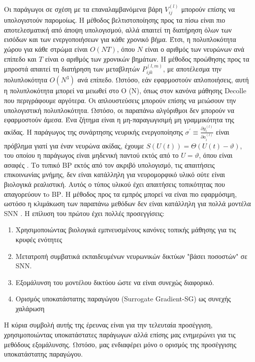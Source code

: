 \documentclass[12pt]{report}
\begin{document}
Οι παράγωγοι σε σχέση με τα επαναλαμβανόμενα βάρη $V_{i j}^{(l)}$ μπορούν επίσης να υπολογιστούν παρομοίως. Η μέθοδος βελτιστοποίησης προς τα πίσω είναι πιο αποτελεσματική από άποψη υπολογισμού, αλλά απαιτεί τη διατήρηση όλων των εισόδων και των ενεργοποιήσεων για κάθε χρονικό βήμα. Έτσι, η πολυπλοκότητα χώρου για κάθε στρώμα είναι $O(N T)$, όπου $N$ είναι ο αριθμός των νευρώνων ανά επίπεδο και $T$ είναι ο αριθμός των χρονικών βημάτων. Η μέθοδος προώθησης προς τα μπροστά απαιτεί τη διατήρηση των μεταβλητών $P_{i j k}^{(l, m)}$, με αποτέλεσμα την πολυπλοκότητα $O\left(N^{3}\right)$ ανά επίπεδο. Ωστόσο, εάν εφαρμοστούν απλοποιήσεις, αυτή η πολυπλοκότητα μπορεί να μειωθεί στο O (N), όπως στον κανόνα μάθησης \textlatin{Decolle} που περιγράφουμε αργότερα. Οι απλουστεύσεις μπορούν επίσης να μειώσουν την υπολογιστική πολυπλοκότητα.
Ωστόσο, οι παραπάνω αλγόριθμοι δεν μπορούν να εφαρμοστούν άμεσα. Ένα ζήτημα είναι η μη-παραγωγισιμή μη γραμμικότητα της ακίδας. Η παράγωγος της συνάρτησης νευρικής ενεργοποίησης $\sigma^{\prime} \equiv \frac{\partial y_{i}^{(l)}}{\partial a_{i}^{(l)}}$ είναι  πρόβλημα γιατί για έναν νευρώνα ακίδας, έχουμε $S(U(t))=\Theta(U(t)-\vartheta)$, του οποίου η παράγωγος είναι μηδενική παντού εκτός από το $U=\vartheta$, όπου είναι ασαφές . Το τυπικό \textlatin{BP} εκτός από τον ακριβό υπολογισμό, τις απαιτήσεις επικοινωνίας μνήμης, δεν είναι κατάλληλη για νευρομορφικό υλικό ούτε είναι βιολογικά ρεαλιστική. Αυτός ο τύπος υλικού έχει απαιτήσεις τοπικότητας που απαγορεύουν τo \textlatin{BP}. Η μέθοδος προς τα εμπρός μπορεί να είναι πιο εφαρμόσιμη, ωστόσο η κλιμάκωση των παραπάνω μεθόδων δεν είναι κατάλληλη για πολλά μοντέλα \textlatin{SNN} .
Η επίλυση του πρώτου έχει πολλές προσεγγίσεις:

\begin{enumerate}
\item Χρησιμοποιώντας βιολογικά εμπνευσμένους κανόνες τοπικής μάθησης για τις κρυφές ενότητες
\item Μετατροπή συμβατικά εκπαιδευμένων νευρωνικών δικτύων "βάσει ποσοστών" σε SNN.
\item Εξομάλυνση του μοντέλου δικτύου ώστε να είναι συνεχώς διαφορικό.
\item Ορισμός υποκατάστατης παραγώγου (\textlatin{Surrogate Gradient}-\textlatin{SG}) ως συνεχής χαλάρωση
\end{enumerate}

Η κύρια συμβολή αυτής της έρευνας είναι για την τελευταία προσέγγιση, χρησιμοποιώντας υποκατάστατες παράγωγων αλλά επίσης μας ενημερώνει για τις μεθόδους εξομάλυνσης. Ωστόσο, μας ενδιαφέρει μόνο ο ορισμός της προσέγγισης υποκατάστατης παραγώγου.
\end{document}
